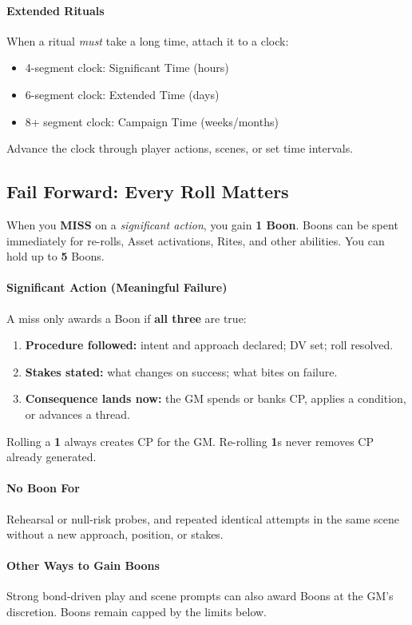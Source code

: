\documentclass[11pt]{article}
\begin{document}
\paragraph{Extended Rituals}
When a ritual \emph{must} take a long time, attach it to a clock:
\begin{itemize}
    \item 4-segment clock: Significant Time (hours)
    \item 6-segment clock: Extended Time (days)
    \item 8+ segment clock: Campaign Time (weeks/months)
\end{itemize}
Advance the clock through player actions, scenes, or set time intervals.

\subsection*{Fail Forward: Every Roll Matters}

When you \textbf{MISS} on a \emph{significant action}, you gain \textbf{1 Boon}. Boons can be spent immediately for re-rolls, Asset activations, Rites, and other abilities. You can hold up to \textbf{5} Boons.

\paragraph{Significant Action (Meaningful Failure)}
A miss only awards a Boon if \textbf{all three} are true:
\begin{enumerate}
  \item \textbf{Procedure followed:} intent and approach declared; DV set; roll resolved.
  \item \textbf{Stakes stated:} what changes on success; what bites on failure.
  \item \textbf{Consequence lands now:} the GM spends or banks CP, applies a condition, or advances a thread.
\end{enumerate}
\noindent Rolling a \textbf{1} always creates CP for the GM. Re-rolling \textbf{1}s never removes CP already generated.

\paragraph{No Boon For}
Rehearsal or null-risk probes, and repeated identical attempts in the same scene without a new approach, position, or stakes.

\paragraph{Other Ways to Gain Boons}
Strong bond-driven play and scene prompts can also award Boons at the GM's discretion. Boons remain capped by the limits below.
\end{document}
